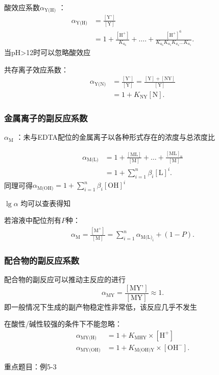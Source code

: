 酸效应系数$\alpha_\text{Y(H)} $ ：
\begin{align*}
    \alpha_\text{Y(H)} &= \frac{[\text{Y'}]}{[\text{Y}]}  \\
                       &= 1+\frac{[\text{H}^+]}{K_{a_6}} +\ldots .+\frac{[\text{H}^+]^6}{K_{a_6}K_{a_5}K_{a_4}\ldots K_{a_1} }
.\end{align*}
当pH>12时可以忽略酸效应

共存离子效应系数：
\begin{align*}
    \alpha_\text{Y(N)} &= \frac{[\text{Y'}]}{[\text{Y}]} =\frac{[\text{Y}]+[\text{NY}]}{[\text{Y}]}  \\
                       &= 1+K_\text{NY} [\text{N}]
.\end{align*}

\subsubsection*{金属离子的副反应系数}%
\label{subsub:金属离子的副反应系数}
\begin{defi}
    $\alpha_\text{M} $ ：未与EDTA配位的金属离子以各种形式存在的浓度与总浓度比
\end{defi}
\begin{align*}
    \alpha_\text{M(L)} &= 1+\frac{[\text{ML}]}{[\text{M}]} +\ldots +\frac{[\text{ML}]_{n}}{[\text{M}]}  \\
                       &= 1+\sum_{i=1}^{n} \beta_{i}[\text{L}]^{i}
.\end{align*}
同理可得$\alpha_\text{M(OH)} =1+\sum_{i=1}^{n} \beta_{i}[\text{OH}]^{i}$

$\lg\alpha$ 均可以查表得知

若溶液中配位剂有$P$种：
\begin{align*}
    \alpha_\text{M} =\frac{[\text{M}^+]}{[\text{M}]} =\sum_{i=1}^{n} \alpha_{\text{M(L)}_i} +\left( 1-P \right) 
.\end{align*}
\subsubsection*{配合物的副反应系数}%
\label{subsub:配合物的副反应系数}
配合物的副反应可以推动主反应的进行
\[
    \alpha_\text{MY} =\frac{[\text{MY'}]}{[\text{MY}]} \approx 1
.\] 
即一般情况下生成的副产物稳定性非常低，该反应几乎不发生
\begin{notation}
    在酸性/碱性较强的条件下不能忽略：
    \begin{align*}
        \alpha_\text{MY(H)} &=1+K_\text{MHY} \times [\text{H}^+]\\
        \alpha_\text{MY(OH)} &=1+K_\text{M(OH)Y} \times [\text{OH}^-]
    .\end{align*}
\end{notation}
重点题目：例5-3
